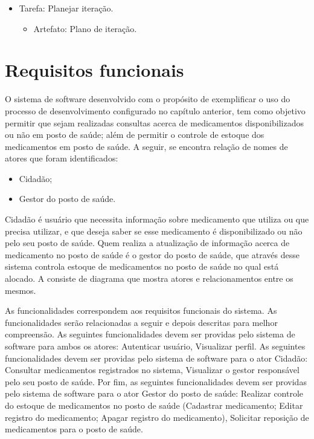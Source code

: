 \begin{itemize}
    \item Tarefa: Planejar iteração.
    \begin{itemize}
        \item Artefato: Plano de iteração.
    \end{itemize}
\end{itemize}


\section{Requisitos funcionais}
\label{sec:visão do sistema}

O sistema de software desenvolvido com o propósito de  exemplificar o uso do processo de desenvolvimento configurado no capítulo anterior, tem como objetivo permitir que sejam realizadas consultas acerca de medicamentos disponibilizados ou não em posto de saúde; além de permitir o controle de estoque dos medicamentos em posto de saúde. A seguir, se encontra relação de nomes de atores que foram identificados:

\begin{itemize}
    \item Cidadão;
    \item Gestor do posto de saúde.
\end{itemize}

%

Cidadão é usuário que necessita informação sobre medicamento que utiliza ou que precisa utilizar, e que deseja saber se esse medicamento é disponibilizado ou não pelo seu posto de saúde. Quem realiza a atualização de informação acerca de medicamento no posto de saúde é o gestor do posto de saúde, que através desse sistema controla estoque de medicamentos no posto de saúde no qual está alocado. A  consiste de diagrama que mostra atores e relacionamentos entre os mesmos.

As funcionalidades correspondem aos requisitos funcionais do sistema. As funcionalidades serão relacionadas a seguir e depois descritas para melhor compreensão. As seguintes funcionalidades devem ser providas pelo sistema de software para ambos os atores: Autenticar usuário, Visualizar perfil. As seguintes  funcionalidades devem ser providas pelo sistema de software para o ator Cidadão: Consultar medicamentos registrados no sistema, Visualizar o gestor responsável pelo seu posto de saúde. Por fim, as seguintes funcionalidades devem ser providas pelo sistema de software para o ator Gestor do posto de saúde: Realizar controle do estoque de medicamentos no posto de saúde (Cadastrar medicamento; Editar registro do medicamento; Apagar registro do medicamento), Solicitar reposição de medicamentos para o posto de saúde.

